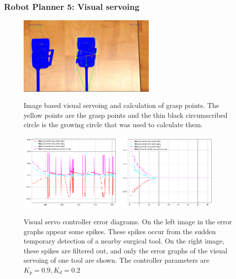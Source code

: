 \begin{frame}
\frametitle{Robot Planner 5: Visual servoing}
\begin{center}
\begin{figure}[H]
\centering
\includegraphics[width=0.6\textwidth]{../images/grasp-points-triangle.png}\\
\caption{Image based visual servoing and calculation of grasp points. The yellow points are the grasp points and the thin black circumscribed circle is the growing circle that was used to calculate them.}
\end{figure}
\end{center}
\end{frame}

\begin{frame}
\begin{center}
\begin{figure}[H]
\centering
\includegraphics[width=0.45\textwidth]{../images/robot_planner5/visual_servo_controller3.png}
\includegraphics[width=0.45\textwidth]{../images/robot_planner5/visual_servo_controller4.png}\\
\caption{Visual servo controller error diagrams. On the left image in the error graphs appear some spikes. These spikes occur from the sudden temporary detection 
of a nearby surgical tool. On the right image, these spikes are filtered out, and only the error graphs of the visual servoing of one tool are shown. The  
controller parameters are $K_p = 0.9, K_d = 0.2$}
\end{figure}
\end{center}
\end{frame}